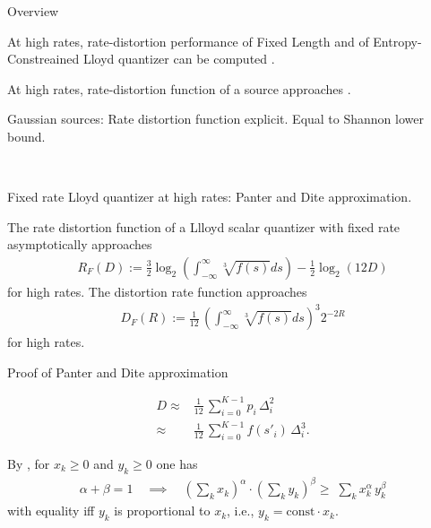 \begin{frame}{Overview}
\bit
\item At high rates, rate-distortion performance of Fixed Length and of Entropy-Constreained Lloyd quantizer can be computed .
\item {} At high rates, rate-distortion function of a source approaches .
\item Gaussian sources: Rate distortion function explicit. Equal to Shannon lower bound. 
\eit
\bit
\item[\iarrow]   \\
\vspace{4.0ex}
\eit
\end{frame}




%

\begin{frame}{Fixed rate Lloyd quantizer at high rates: Panter and Dite approximation.}
\begin{proposition}
The rate distortion function of a Llloyd scalar quantizer with fixed rate asymptotically approaches 
\begin{align*}
R_F(D):=\frac{3}{2}\log_2\left(\int_{-\infty}^{\infty}\sqrt[3]{f(s)}ds \right)-\frac{1}{2}\log_2(12D)
\end{align*}
for high rates. The distortion rate function approaches
\begin{align*}
D_F(R):= \frac{1}{12}\,\left(\int_{-\infty}^{\infty}\sqrt[3]{f(s)}ds \right)^{\!3}
2^{-2R}
\end{align*}
for high rates. 
\end{proposition}
\end{frame}

\begin{frame}{Proof of Panter and Dite approximation}
\bit
\item {} 
\begin{align}\label{DistPantDite}
D \approx &\frac{1}{12}\,\sum_{i=0}^{K-1} p_i\,\Delta_i^2\\ \approx &\frac{1}{12}\,\sum_{i=0}^{K-1} f(s'_i)\,\Delta_i^3.
\end{align}
\item By , for $x_k\geq0$ and $y_k\geq0$ one has
  \vspace{-0.5ex}
  \begin{align}\label{Hoeld}
  \alpha+\beta=1
    \quad\implies\quad
    \left(\sum\nolimits_kx_k\right)^{\!\alpha}\!\cdot
    \left(\sum\nolimits_ky_k\right)^{\!\beta}\geq\;
    \sum\nolimits_kx_k^{\alpha}\,y_k^{\beta}
 \end{align}
  with equality iff $y_k$ is proportional to $x_k$, i.e., $y_k=\text{const}\cdot x_k$.
\eit
\end{frame}


